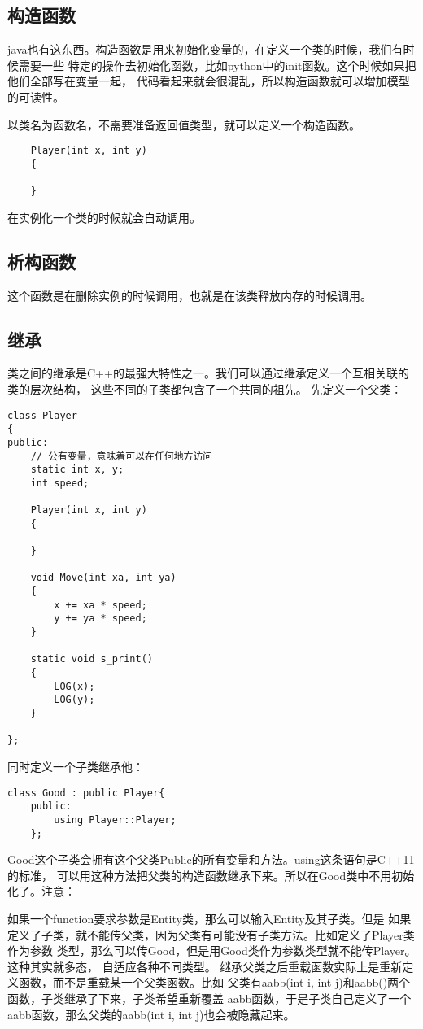 \documentclass{article}
\begin{document}
\begin{sloppypar}
\subsection{构造函数}
java也有这东西。构造函数是用来初始化变量的，在定义一个类的时候，我们有时候需要一些
特定的操作去初始化函数，比如python中的init函数。这个时候如果把他们全部写在变量一起，
代码看起来就会很混乱，所以构造函数就可以增加模型的可读性。

以类名为函数名，不需要准备返回值类型，就可以定义一个构造函数。
\begin{lstlisting}
	Player(int x, int y)
    {
        
    }
\end{lstlisting}
在实例化一个类的时候就会自动调用。

\subsection{析构函数}
这个函数是在删除实例的时候调用，也就是在该类释放内存的时候调用。

\subsection{继承}
类之间的继承是C++的最强大特性之一。我们可以通过继承定义一个互相关联的类的层次结构，
这些不同的子类都包含了一个共同的祖先。
先定义一个父类：
\begin{lstlisting}
class Player
{
public:
    // 公有变量，意味着可以在任何地方访问
    static int x, y;
    int speed;

    Player(int x, int y)
    {

    }

    void Move(int xa, int ya)
    {
        x += xa * speed;
        y += ya * speed;
    }

    static void s_print()
    {
        LOG(x);
        LOG(y);
    }

};
\end{lstlisting}
同时定义一个子类继承他：
\begin{lstlisting}
class Good : public Player{
	public:
		using Player::Player;
	};
\end{lstlisting}
Good这个子类会拥有这个父类Public的所有变量和方法。using这条语句是C++11的标准，
可以用这种方法把父类的构造函数继承下来。所以在Good类中不用初始化了。注意：
\begin{outline}
	\1 如果一个function要求参数是Entity类，那么可以输入Entity及其子类。但是
	如果定义了子类，就不能传父类，因为父类有可能没有子类方法。比如定义了Player类作为参数
	类型，那么可以传Good，但是用Good类作为参数类型就不能传Player。这种其实就多态，
	自适应各种不同类型。
	\1 继承父类之后重载函数实际上是重新定义函数，而不是重载某一个父类函数。比如
	父类有aabb(int i, int j)和aabb()两个函数，子类继承了下来，子类希望重新覆盖
	aabb函数，于是子类自己定义了一个aabb函数，那么父类的aabb(int i, int j)也会被隐藏起来。
\end{outline}


\end{sloppypar}
\end{document}
